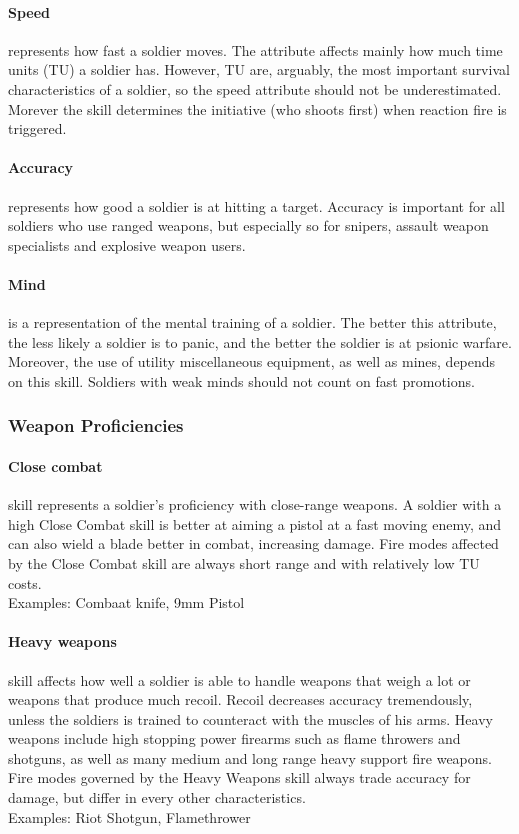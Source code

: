 \paragraph*{Speed}
 represents how fast a soldier moves. The attribute affects mainly how much time units (TU) a soldier has. However, TU are, arguably, the most important survival characteristics of a soldier, so the speed attribute should not be underestimated. Morever the skill determines the initiative (who shoots first) when reaction fire is triggered.
\paragraph*{Accuracy}
 represents how good a soldier is at hitting a target. Accuracy is important for all soldiers who use ranged weapons, but especially so for snipers, assault weapon specialists and explosive weapon users.
\paragraph*{Mind}
 is a representation of the mental training of a soldier. The better this attribute, the less likely a soldier is to panic, and the better the soldier is at psionic warfare. Moreover, the use of utility miscellaneous equipment, as well as mines, depends on this skill. Soldiers with weak minds should not count on fast promotions.
\subsubsection{Weapon Proficiencies}
\paragraph*{Close combat}
 skill represents a soldier's proficiency with close-range weapons. A soldier with a high Close Combat skill is better at aiming a pistol at a fast moving enemy, and can also wield a blade better in combat, increasing damage. Fire modes affected by the Close Combat skill are always short range and with relatively low TU costs.\\
Examples: Combaat knife, 9mm Pistol
\paragraph*{Heavy weapons}
 skill affects how well a soldier is able to handle weapons that weigh a lot or weapons that produce much recoil. Recoil decreases accuracy tremendously, unless the soldiers is trained to counteract with the muscles of his arms. Heavy weapons include high stopping power firearms such as flame throwers and shotguns, as well as many medium and long range heavy support fire weapons. Fire modes governed by the Heavy Weapons skill always trade accuracy for damage, but differ in every other characteristics.\\
Examples: Riot Shotgun, Flamethrower
